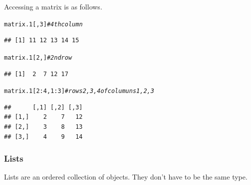 \documentclass{article}\usepackage[]{graphicx}\usepackage[]{color}
\makeatletter
\newcommand{\hlnum}[1]{\textcolor[rgb]{0.686,0.059,0.569}{#1}}%
\newcommand{\hlcom}[1]{\textcolor[rgb]{0.678,0.584,0.686}{\textit{#1}}}%
\newcommand{\hlopt}[1]{\textcolor[rgb]{0,0,0}{#1}}%
\newcommand{\hlstd}[1]{\textcolor[rgb]{0.345,0.345,0.345}{#1}}%
\newenvironment{kframe}{%
 \def\at@end@of@kframe{}%
 \ifinner\ifhmode%
  \def\at@end@of@kframe{\end{minipage}}%
  \begin{minipage}{\columnwidth}%
 \fi\fi%
 \def\FrameCommand##1{\hskip\@totalleftmargin \hskip-\fboxsep
 \colorbox{shadecolor}{##1}\hskip-\fboxsep
     \hskip-\linewidth \hskip-\@totalleftmargin \hskip\columnwidth}%
 \MakeFramed {\advance\hsize-\width
   \@totalleftmargin\z@ \linewidth\hsize
   \@setminipage}}%
 {\par\unskip\endMakeFramed%
 \at@end@of@kframe}
\newenvironment{knitrout}{}{} %
\makeatother
\begin{document}
    Accessing a matrix is as follows.
    
\begin{knitrout}
\color{fgcolor}\begin{kframe}
\begin{alltt}
  \hlstd{matrix.1[,}\hlnum{3}\hlstd{]}  \hlcom{# 4th column}
\end{alltt}
\begin{verbatim}
## [1] 11 12 13 14 15
\end{verbatim}
\begin{alltt}
  \hlstd{matrix.1[}\hlnum{2}\hlstd{,]}  \hlcom{# 2nd row}
\end{alltt}
\begin{verbatim}
## [1]  2  7 12 17
\end{verbatim}
\begin{alltt}
  \hlstd{matrix.1[}\hlnum{2}\hlopt{:}\hlnum{4}\hlstd{,} \hlnum{1}\hlopt{:}\hlnum{3}\hlstd{]} \hlcom{# rows 2, 3 ,4 of columuns 1, 2, 3}
\end{alltt}
\begin{verbatim}
##      [,1] [,2] [,3]
## [1,]    2    7   12
## [2,]    3    8   13
## [3,]    4    9   14
\end{verbatim}
\end{kframe}
\end{knitrout}
    
    \subsubsection*{Lists}
    
    Lists are an ordered collection of objects. They don't have to be the same type.
    
\end{document}
